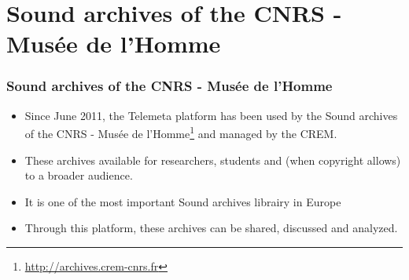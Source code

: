 \documentclass[final, hyperref, table]{beamer}
\begin{document}
\section{Sound archives of the CNRS - Musée de l'Homme}\label{sec:archives-CREM}
   \begin{frame}\frametitle{Sound archives of the CNRS - Musée de l'Homme}
     \begin{block}{}
       \begin{itemize}
       \item Since June 2011, the Telemeta platform has been used by
         the \alert{Sound archives of the CNRS - Musée de
         l'Homme}\footnote{\url{http://archives.crem-cnrs.fr}} and
         managed by the CREM.
       \item These archives available for researchers,
         students and (when copyright allows) to a broader audience.
       \item It is one of the most important Sound archives librairy in Europe
       \item Through this platform, these archives can be shared,
         discussed and analyzed.
       
       
       \end{itemize}
     \end{block}


\end{frame}
\end{document}

